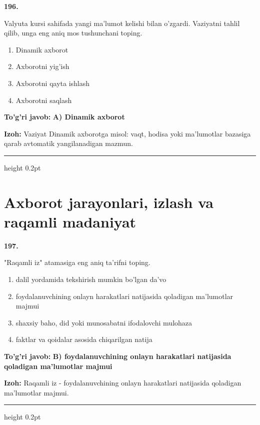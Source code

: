 \documentclass[10pt,a4paper,oneside]{article}
\begin{document}
\noindent\textbf{\color{ink}196.}
\par
Valyuta kursi sahifada yangi ma'lumot kelishi bilan o'zgardi. Vaziyatni tahlil qilib, unga eng aniq mos tushunchani toping.
\begin{enumerate}[label=\Alph*),leftmargin=9mm]
\item Dinamik axborot
\item Axborotni yig'ish
\item Axborotni qayta ishlash
\item Axborotni saqlash
\end{enumerate}
\begin{tcolorbox}[enhanced,breakable,colback=teal!4,colframe=teal!50!black,boxrule=0.5pt,arc=1.1mm,left=3mm,right=3mm,top=1.7mm,bottom=1.7mm,before skip=2mm,after skip=2mm]
\textbf{\color{teal}To'g'ri javob:} \textbf{A) Dinamik axborot}
\par\smallskip
\textbf{Izoh:} Vaziyat Dinamik axborotga misol: vaqt, hodisa yoki ma'lumotlar bazasiga qarab avtomatik yangilanadigan mazmun.
\end{tcolorbox}
\vspace{2mm}\hrule height 0.2pt \vspace{3mm}
\section{Axborot jarayonlari, izlash va raqamli madaniyat}

\noindent\textbf{\color{ink}197.}
\par
"Raqamli iz" atamasiga eng aniq ta'rifni toping.
\begin{enumerate}[label=\Alph*),leftmargin=9mm]
\item dalil yordamida tekshirish mumkin bo'lgan da'vo
\item foydalanuvchining onlayn harakatlari natijasida qoladigan ma'lumotlar majmui
\item shaxsiy baho, did yoki munosabatni ifodalovchi mulohaza
\item faktlar va qoidalar asosida chiqarilgan natija
\end{enumerate}
\begin{tcolorbox}[enhanced,breakable,colback=teal!4,colframe=teal!50!black,boxrule=0.5pt,arc=1.1mm,left=3mm,right=3mm,top=1.7mm,bottom=1.7mm,before skip=2mm,after skip=2mm]
\textbf{\color{teal}To'g'ri javob:} \textbf{B) foydalanuvchining onlayn harakatlari natijasida qoladigan ma'lumotlar majmui}
\par\smallskip
\textbf{Izoh:} Raqamli iz - foydalanuvchining onlayn harakatlari natijasida qoladigan ma'lumotlar majmui.
\end{tcolorbox}
\vspace{2mm}\hrule height 0.2pt \vspace{3mm}
\end{document}
